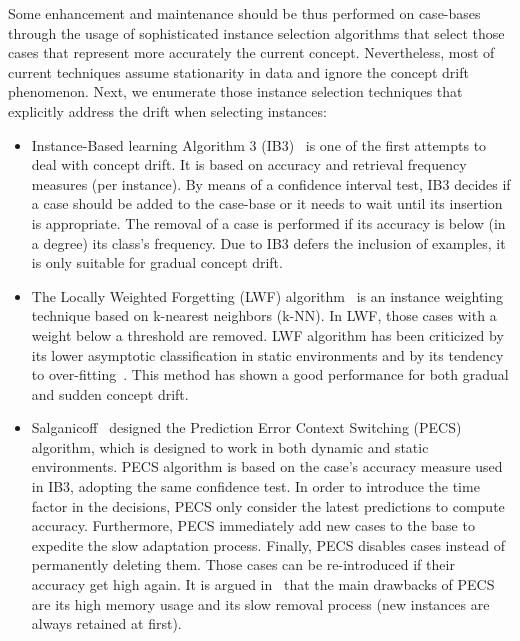 \documentclass[preprint,12pt]{elsarticle}
\begin{document}
Some enhancement and maintenance should be thus performed on case-bases through the usage of sophisticated instance selection algorithms that select those cases that represent more accurately the current concept. Nevertheless, most of current techniques assume stationarity in data and ignore the concept drift phenomenon. Next, we enumerate those instance selection techniques that explicitly address the drift when selecting instances:

\begin{itemize}
	\item Instance-Based learning Algorithm 3 (IB3)~\cite{aha91} is one of the first attempts to deal with concept drift. It is based on accuracy and retrieval frequency measures (per instance). By means of a confidence interval test, IB3 decides if a case should be added to the case-base or it needs to wait until its insertion is appropriate. The removal of a case is performed if its accuracy is below (in a degree) its class's frequency. Due to IB3 defers the inclusion of examples, it is only suitable for gradual concept drift. 
	\item The Locally Weighted Forgetting (LWF) algorithm~\cite{salga93} is an instance weighting technique based on k-nearest neighbors (k-NN). In LWF, those cases with a weight below a threshold are removed. LWF algorithm has been criticized by its lower asymptotic classification in static environments and by its tendency to over-fitting~\cite{klinken04}. This method has shown a good performance for both gradual and sudden concept drift. 
	\item Salganicoff~\cite{salga97} designed the Prediction Error Context Switching (PECS) algorithm, which is designed to work in both dynamic and static environments. PECS algorithm is based on the case's accuracy measure used in IB3, adopting the same confidence test. In order to introduce the time factor in the decisions, PECS only consider the latest predictions to compute accuracy. Furthermore, PECS immediately add new cases to the base to expedite the slow adaptation process. Finally, PECS disables cases instead of permanently deleting them. Those cases can be re-introduced if their accuracy get high again. It is argued in~\cite{berin07} that the main drawbacks of PECS are its high memory usage and its slow removal process (new instances are always retained at first).

\end{itemize}
\end{document}
